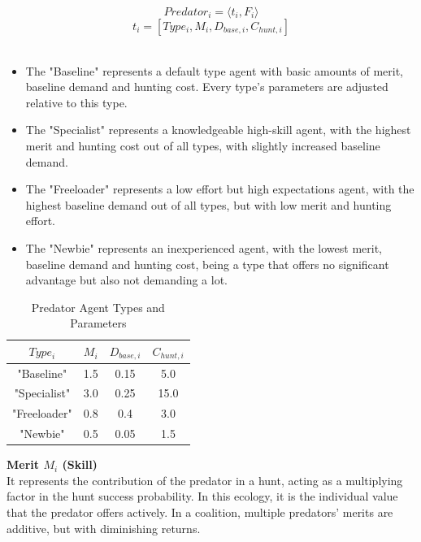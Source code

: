 \documentclass[12pt,a4paper]{report}
\begin{document}
	\[{Predator}_i = \langle t_i, F_{i} \rangle\]
	\[t_i = [Type_{i}, M_{i}, D_{base,i} , C_{hunt,i}] \] \\
	
	\begin{itemize}
		\item The "Baseline" represents a default type agent with basic amounts of merit, baseline demand and hunting cost. Every type's parameters are adjusted relative to this type.
		
		\item The "Specialist" represents a knowledgeable high-skill agent, with the highest merit and hunting cost out of all types, with slightly increased baseline demand.
		
		\item The "Freeloader" represents a low effort but high expectations agent, with the highest baseline demand out of all types, but with low merit and hunting effort. 
		
		\item The "Newbie" represents an inexperienced agent, with the lowest merit, baseline demand and hunting cost, being a type that offers no significant advantage but also not demanding a lot. \\  
	\end{itemize}
	
	\begin{table}[H]
		\centering
		\begin{tabular}{|c|c|c|c|}
			\hline
			$Type_{i}$ & $M_{i}$ & $D_{base,i}$ & $C_{hunt,i}$ \\
			\hline
			"Baseline" & 1.5 & 0.15 & 5.0 \\
			"Specialist" & 3.0 & 0.25 & 15.0 \\
			"Freeloader" & 0.8 & 0.4 & 3.0 \\
			"Newbie" & 0.5 & 0.05 & 1.5 \\
			\hline
		\end{tabular}
		\caption{Predator Agent Types and Parameters}
	\end{table}
	
	\textbf{Merit $M_{i}$ (Skill)} \\
	
	It represents the contribution of the predator in a hunt, acting as a multiplying factor in the hunt success probability. In this ecology, it is the individual value that the predator offers actively. In a coalition, multiple predators' merits are additive, but with diminishing returns.\\
	
\end{document}
